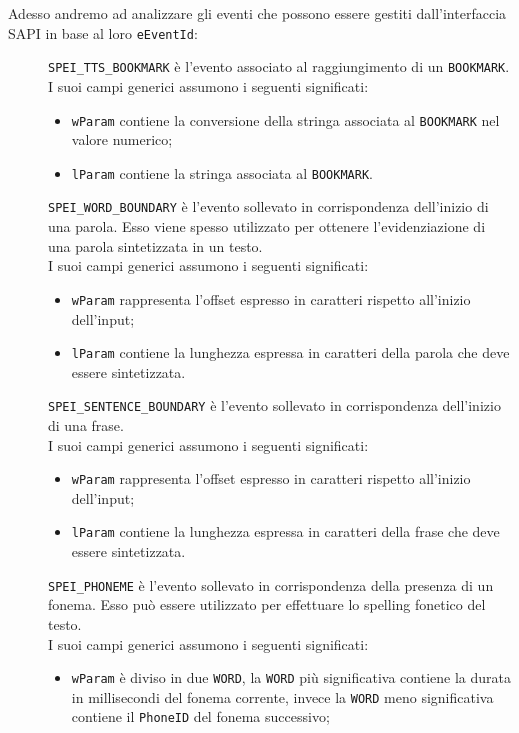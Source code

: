 	Adesso andremo ad analizzare gli eventi che possono essere gestiti dall'interfaccia SAPI in base al loro \texttt{eEventId}: 
	\begin{description}
		\item [] \texttt{SPEI\_TTS\_BOOKMARK} è l'evento associato al raggiungimento di un \texttt{BOOKMARK}.\\
		I suoi campi generici assumono i seguenti significati:
		\begin{itemize}
			\item \texttt{wParam} contiene la conversione della stringa associata al \texttt{BOOKMARK} nel valore numerico;
			\item \texttt{lParam} contiene la stringa associata al \texttt{BOOKMARK}.
		\end{itemize}
		\item [] \texttt{SPEI\_WORD\_BOUNDARY} è l'evento sollevato in corrispondenza dell'inizio di una parola. Esso viene spesso utilizzato per ottenere l'evidenziazione di una parola sintetizzata in un testo.\\
		I suoi campi generici assumono i seguenti significati:
		\begin{itemize}
			\item \texttt{wParam} rappresenta l'offset espresso in caratteri rispetto all'inizio dell'input;
			\item \texttt{lParam} contiene la lunghezza espressa in caratteri della parola che deve essere sintetizzata.
		\end{itemize}
		\item [] \texttt{SPEI\_SENTENCE\_BOUNDARY} è l'evento sollevato in corrispondenza dell'inizio di una frase.\\
		I suoi campi generici assumono i seguenti significati:
		\begin{itemize}
			\item \texttt{wParam} rappresenta l'offset espresso in caratteri rispetto all'inizio dell'input;
			\item \texttt{lParam} contiene la lunghezza espressa in caratteri della frase che deve essere sintetizzata.
		\end{itemize}
		\item [] \texttt{SPEI\_PHONEME} è l'evento sollevato in corrispondenza della presenza di un fonema. Esso può essere utilizzato per effettuare lo spelling fonetico del testo.\\
		I suoi campi generici assumono i seguenti significati:
		\begin{itemize}
			\item \texttt{wParam} è diviso in due \texttt{WORD}, la \texttt{WORD} più significativa contiene la durata in millisecondi del fonema corrente, invece la \texttt{WORD} meno significativa contiene il \texttt{PhoneID} del fonema successivo;

\end{itemize}
\end{description}
